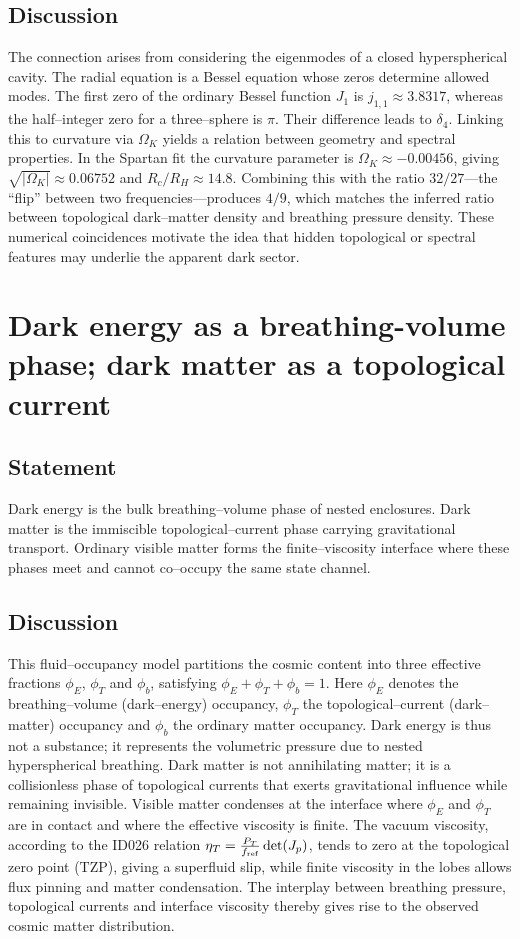 \documentclass[12pt,a4paper]{article}
\begin{document}
\subsection{Discussion}
The connection arises from considering the eigenmodes of a closed hyperspherical cavity.  The radial equation is a Bessel equation whose zeros determine allowed modes.  The first zero of the ordinary Bessel function $J_1$ is $j_{1,1}\approx3.8317$, whereas the half–integer zero for a three–sphere is $\pi$.  Their difference leads to $\delta_4$.  Linking this to curvature via $\Omega_K$ yields a relation between geometry and spectral properties.  In the Spartan fit the curvature parameter is $\Omega_K \approx -0.00456$, giving $\sqrt{|\Omega_K|}\approx0.06752$ and $R_c/R_H\approx14.8$.  Combining this with the ratio $32/27$—the ``flip'' between two frequencies—produces $4/9$, which matches the inferred ratio between topological dark–matter density and breathing pressure density.  These numerical coincidences motivate the idea that hidden topological or spectral features may underlie the apparent dark sector.

\section{Dark energy as a breathing-volume phase; dark matter as a topological current}
\label{sec:interface}
\subsection{Statement}
Dark energy is the bulk breathing–volume phase of nested enclosures.  Dark matter is the immiscible topological–current phase carrying gravitational transport.  Ordinary visible matter forms the finite–viscosity interface where these phases meet and cannot co–occupy the same state channel.

\subsection{Discussion}
This fluid–occupancy model partitions the cosmic content into three effective fractions $\phi_E$, $\phi_T$ and $\phi_b$, satisfying $\phi_E + \phi_T + \phi_b = 1$.  Here $\phi_E$ denotes the breathing–volume (dark–energy) occupancy, $\phi_T$ the topological–current (dark–matter) occupancy and $\phi_b$ the ordinary matter occupancy.  Dark energy is thus not a substance; it represents the volumetric pressure due to nested hyperspherical breathing.  Dark matter is not annihilating matter; it is a collisionless phase of topological currents that exerts gravitational influence while remaining invisible.  Visible matter condenses at the interface where $\phi_E$ and $\phi_T$ are in contact and where the effective viscosity is finite.  The vacuum viscosity, according to the ID026 relation $\eta_T = \frac{P_T}{f_{\rm ref}} \det(J_p)$, tends to zero at the topological zero point (TZP), giving a superfluid slip, while finite viscosity in the lobes allows flux pinning and matter condensation.  The interplay between breathing pressure, topological currents and interface viscosity thereby gives rise to the observed cosmic matter distribution.
\end{document}
